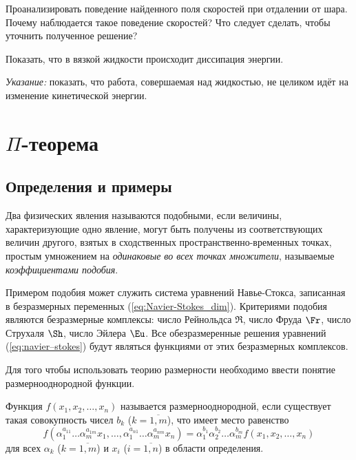 \documentclass[14pt]{extarticle}
\begin{document}
\begin{problems}
	\item 
	Проанализировать поведение найденного поля скоростей при отдалении от шара. Почему наблюдается такое поведение скоростей? Что следует сделать, чтобы уточнить полученное решение? 
	
	\item
	Показать, что в вязкой жидкости происходит диссипация энергии.
	 
	{\small \textit{Указание:} показать, что работа, совершаемая над жидкостью, не целиком идёт на изменение кинетической энергии.}

\end{problems}

\newpage

\section{$\Pi$-теорема}

\subsection{Определения и примеры}

\begin{dfn}
	Два физических явления называются \alert{подобными}, если величины, характеризующие одно явление, могут быть получены из соответствующих величин другого, взятых в сходственных пространст\-вен\-но-вре\-мен\-ных точках, простым умножением на \textit{одинаковые во всех точках множители}, называемые \textit{коэффициентами подобия}.
\end{dfn}

Примером подобия может служить система уравнений Навье-Стокса, записанная в безразмерных переменных (\ref{eq:Navier-Stokes_dim}). Критериями подобия являются безразмерные комплексы: число Рейнольдса $\Re$, число Фруда $\Fr$, число Струхаля $\Sh$, число Эйлера $\Eu$. Все обезразмеренные решения уравнений (\ref{eq:navier–stokes}) будут являться функциями от этих безразмерных комплексов.

Для того чтобы использовать теорию размерности необходимо ввести понятие \alert{размернооднородной} функции. 

\begin{dfn}
	Функция $f(x_1, x_2, \ldots, x_n)$ называется \alert{размернооднородной}, если существует такая совокупность чисел $b_k$ ($k=\overline{1,m}$), что имеет место равенство
	\begin{equation}
	\label{eq:dimension_uniform_function_dfn}
	f(\alpha_1^{a_{11}}\ldots \alpha_m^{a_{1m}}x_1,\ldots,
	\alpha_1^{a_{n1}}\ldots \alpha_m^{a_{nm}}x_n) = 
	\alpha_1^{b_1}\alpha_2^{b_2}\ldots \alpha_m^{b_m} f(x_1, x_2, \ldots, x_n)
	\end{equation}
	для всех $\alpha_k$ ($k=\overline{1,m}$) и $x_i$ ($i=\overline{1,n}$) в области определения.
\end{dfn}
\end{document}
